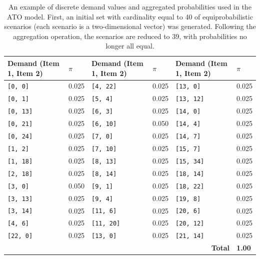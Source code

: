 \documentclass[a4paper,12pt]{article}
\begin{document}
	
	\begin{table}[H]
		\centering
		\footnotesize
		\label{tab:ato-general-results}
		\renewcommand{\arraystretch}{1.1}
		\begin{tabular}{|@{\hskip 2pt}p{3.2cm}@{\hskip 2pt}|@{\hskip 2pt}p{1cm}@{\hskip 2pt}||@{\hskip 2pt}p{3.2cm}@{\hskip 2pt}|@{\hskip 2pt}p{1cm}@{\hskip 2pt}||@{\hskip 2pt}p{3.2cm}@{\hskip 2pt}|@{\hskip 2pt}p{1cm}@{\hskip 2pt}|}
			\hline
			\textbf{Demand (Item 1, Item 2)} & \textbf{$\pi$} &
			\textbf{Demand (Item 1, Item 2)} & \textbf{$\pi$} &
			\textbf{Demand (Item 1, Item 2)} & \textbf{$\pi$} \\
			\hline
			\texttt{[0, 0]}    & 0.025 & \texttt{[4, 22]}   & 0.025 & \texttt{[13, 0]}   & 0.025 \\
			\texttt{[0, 1]}    & 0.025 & \texttt{[5, 4]}    & 0.025 & \texttt{[13, 12]}  & 0.025 \\
			\texttt{[0, 13]}   & 0.025 & \texttt{[6, 3]}    & 0.025 & \texttt{[14, 0]}   & 0.025 \\
			\texttt{[0, 21]}   & 0.025 & \texttt{[6, 10]}   & 0.050 & \texttt{[14, 4]}   & 0.025 \\
			\texttt{[0, 24]}   & 0.025 & \texttt{[7, 0]}    & 0.025 & \texttt{[14, 7]}   & 0.025 \\
			\texttt{[1, 2]}    & 0.025 & \texttt{[7, 10]}   & 0.025 & \texttt{[15, 7]}   & 0.025 \\
			\texttt{[1, 18]}   & 0.025 & \texttt{[8, 13]}   & 0.025 & \texttt{[15, 34]}  & 0.025 \\
			\texttt{[2, 18]}   & 0.025 & \texttt{[8, 14]}   & 0.025 & \texttt{[18, 14]}  & 0.025 \\
			\texttt{[3, 0]}    & 0.050 & \texttt{[9, 1]}    & 0.025 & \texttt{[18, 22]}  & 0.025 \\
			\texttt{[3, 13]}   & 0.025 & \texttt{[9, 4]}    & 0.025 & \texttt{[19, 8]}   & 0.025 \\
			\texttt{[3, 14]}   & 0.025 & \texttt{[11, 6]}   & 0.025 & \texttt{[20, 6]}   & 0.025 \\
			\texttt{[4, 6]}    & 0.025 & \texttt{[11, 20]}  & 0.025 & \texttt{[20, 12]}  & 0.025 \\
			\texttt{[22, 0]}   & 0.025 & \texttt{[13, 0]}   & 0.025 & \texttt{[21, 14]}  & 0.025 \\
			\hline
			\multicolumn{5}{|r|}{\textbf{Total}} & \textbf{1.00} \\
			\hline
		\end{tabular}
		\caption{An example of discrete demand values and aggregated probabilities used in the ATO model. First, an initial set with cardinality equal to 40 of equiprobabilistic scenarios (each scenario is a two-dimensional vector) was generated. Following the aggregation operation, the scenarios are reduced to 39, with probabilities no longer all equal.}
	\end{table}
	
\end{document}
